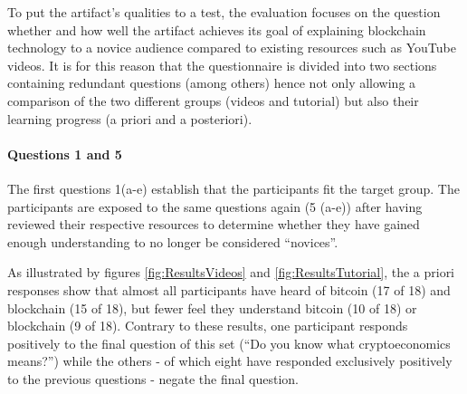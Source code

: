To put the artifact's qualities to a test, the evaluation focuses on the question whether and how well the artifact achieves its goal of explaining blockchain technology to a novice audience compared to existing resources such as YouTube videos. It is for this reason that the questionnaire is divided into two sections containing redundant questions (among others) hence not only allowing a comparison of the two different groups (videos and tutorial) but also their learning progress (a priori and a posteriori).

\paragraph{Questions 1 and 5}The first questions 1(a-e) establish that the participants fit the target group. The participants are exposed to the same questions again (5 (a-e)) after having reviewed their respective resources to determine whether they have gained enough understanding to no longer be considered \enquote{novices}.

As illustrated by figures \ref{fig:ResultsVideos} and \ref{fig:ResultsTutorial}, the a priori responses show that almost all participants have heard of bitcoin (17 of 18) and blockchain (15 of 18), but fewer feel they understand bitcoin (10 of 18) or blockchain (9 of 18). Contrary to these results, one participant responds positively to the final question of this set (\enquote{Do you know what cryptoeconomics means?}) while the others - of which eight have responded exclusively positively to the previous questions - negate the final question.

